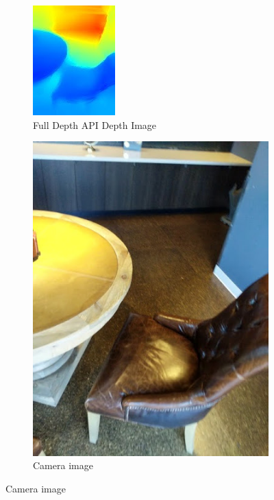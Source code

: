 \begin{figure}[ht!]
    \centering
    \begin{subfigure}[b]{0.4\textwidth}
        \centering
        \includegraphics[width=0.8\linewidth]{images/depth_full-depth-image}
        \caption{Full Depth API Depth Image}
    \end{subfigure}%
    \begin{subfigure}[b]{0.4\textwidth}
        \centering
        \includegraphics[width=0.8\linewidth]{images/depth_camera-image}
        \caption{Camera image}
    \end{subfigure}%


\end{figure}
